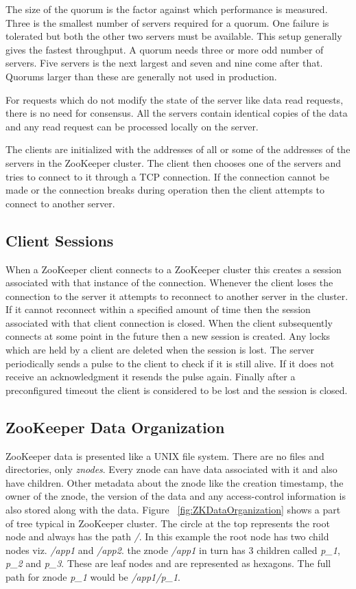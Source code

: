 The size of the quorum is the factor against which performance is measured. Three is the smallest number of servers required for a quorum. One failure is tolerated but both the other two servers must be available. This setup generally gives the fastest throughput. A quorum needs three or more odd number of servers. Five servers is the next largest and seven and nine come after that. Quorums larger than these are generally not used in production.

For requests which do not modify the state of the server like data read requests, there is no need for consensus. All the servers contain identical copies of the data and any read request can be processed locally on the server. 

The clients are initialized with the addresses of all or some of the addresses of the servers in the ZooKeeper cluster. The client then chooses one of the servers and tries to connect to it through a TCP connection. If the connection cannot be made or the connection breaks during operation then the client attempts to connect to another server.

\subsection{Client Sessions}
When a ZooKeeper client connects to a ZooKeeper cluster this creates a session associated with that instance of the connection. Whenever the client loses the connection to the server it attempts to reconnect to another server in the cluster. If it cannot reconnect within a specified amount of time then the session associated with that client connection is closed. When the client subsequently connects at some point in the future then a new session is created. Any locks which are held by a client are deleted when the session is lost. The server periodically sends a pulse to the client to check if it is still alive. If it does not receive an acknowledgment it resends the pulse again. Finally after a preconfigured timeout the client is considered to be lost and the session is closed.

\subsection{ZooKeeper Data Organization}
ZooKeeper data is presented like a UNIX file system. There are no files and directories, only \textit{znodes}. Every znode can have data associated with it and also have children. Other metadata about the znode like the creation timestamp, the owner of the znode, the version of the data and any access-control information is also stored along with the data. Figure ~\ref{fig:ZKDataOrganization} shows a part of tree typical in ZooKeeper cluster. The circle at the top represents the root node and always has the path \textit{/}. In this example the root node has two child nodes viz. \textit{/app1} and \textit{/app2}. the znode \textit{/app1} in turn has 3 children called \textit{p\_1}, \textit{p\_2} and \textit{p\_3}. These are leaf nodes and are represented as hexagons. The full path for znode \textit{p\_1} would be \textit{/app1/p\_1}.


